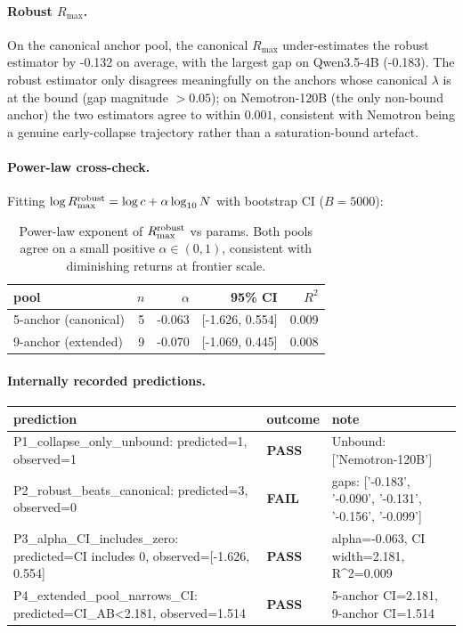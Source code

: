 \paragraph{Robust $R_{\max}$.}
On the canonical anchor pool, the canonical $R_{\max}$ under-estimates the robust estimator by -0.132 on average, with the largest gap on Qwen3.5-4B (-0.183). The robust estimator only disagrees meaningfully on the anchors whose canonical $\lambda$ is at the bound (gap magnitude $>0.05$); on Nemotron-120B (the only non-bound anchor) the two estimators agree to within $0.001$, consistent with Nemotron being a genuine early-collapse trajectory rather than a saturation-bound artefact.\paragraph{Power-law cross-check.}
Fitting $\log R_{\max}^{\rm robust}=\log c + \alpha\log_{10} N$ with bootstrap CI ($B=5000$):
\begin{table}[ht]
\centering\small
\begin{tabular}{lrrrr}
\toprule
pool & $n$ & $\alpha$ & 95\% CI & $R^2$ \\
\midrule
5-anchor (canonical) & 5 & -0.063 & [-1.626, 0.554] & 0.009 \\
9-anchor (extended) & 9 & -0.070 & [-1.069, 0.445] & 0.008 \\
\bottomrule
\end{tabular}
\caption{Power-law exponent of $R_{\max}^{\rm robust}$ vs params.  Both pools agree on a small positive $\alpha\in(0,1)$, consistent with diminishing returns at frontier scale.}
\end{table}

\paragraph{Internally recorded predictions.}
\begin{table}[ht]
\centering\small
\begin{tabular}{lll}
\toprule
prediction & outcome & note \\
\midrule
  P1_collapse_only_unbound: predicted=1, observed=1 & \textbf{PASS} & Unbound: ['Nemotron-120B'] \\
  P2_robust_beats_canonical: predicted=3, observed=0 & \textbf{FAIL} & gaps: ['-0.183', '-0.090', '-0.131', '-0.156', '-0.099'] \\
  P3_alpha_CI_includes_zero: predicted=CI includes 0, observed=[-1.626, 0.554] & \textbf{PASS} & alpha=-0.063, CI width=2.181, R^2=0.009 \\
  P4_extended_pool_narrows_CI: predicted=CI_AB<2.181, observed=1.514 & \textbf{PASS} & 5-anchor CI=2.181, 9-anchor CI=1.514 \\
\bottomrule
\end{tabular}
\end{table}

